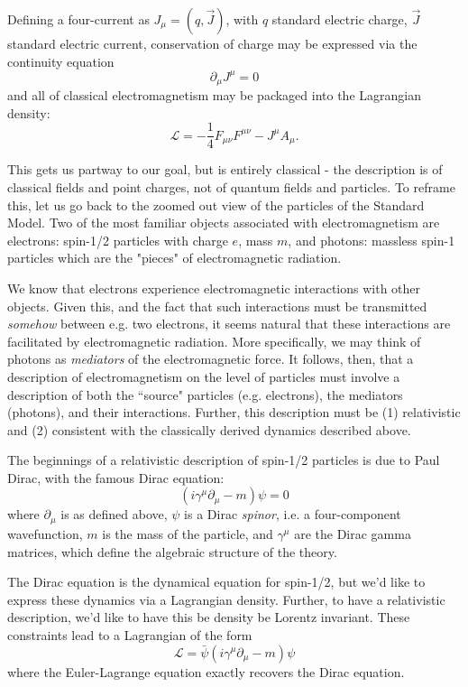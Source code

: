 Defining a four-current as $J_{\mu} = (q, \vec{J})$, with $q$ standard electric charge, $\vec{J}$ standard electric 
current, conservation of charge may be expressed via the continuity equation
\begin{equation}
\partial_{\mu}J^\mu = 0
\end{equation}
and all of classical electromagnetism may be packaged into the Lagrangian density:
\begin{equation}
\mathcal{L} = -\frac{1}{4} F_{\mu\nu}F^{\mu\nu} - J^{\mu}A_{\mu}.
\end{equation}

This gets us partway to our goal, but is entirely classical - the description is of classical fields and 
point charges, not of quantum fields and particles. To reframe this, let us go back to the zoomed out view 
of the particles of the Standard Model. Two of the most familiar objects associated with electromagnetism 
are electrons: spin-1/2 particles with charge $e$, mass $m$, and photons: massless spin-1 particles which are
the "pieces" of electromagnetic radiation.

We know that electrons experience electromagnetic interactions with other objects. Given this, and the 
fact that such interactions must be transmitted \emph{somehow} between e.g. two electrons, it seems natural 
that these interactions are facilitated by electromagnetic radiation. More specifically, we may think of 
photons as \emph{mediators} of the electromagnetic force. It follows, then, that a description of 
electromagnetism on the level of particles must involve a description of both the ``source" particles 
(e.g. electrons), the mediators (photons), and their interactions. Further, this description must be 
(1) relativistic and (2) consistent with the classically derived dynamics described above.

The beginnings of a relativistic description of spin-1/2 particles is due to Paul Dirac, with the 
famous Dirac equation:
\begin{equation}
(i\gamma^{\mu}\partial_{\mu} - m)\psi = 0
\end{equation}
where $\partial_{\mu}$ is as defined above, $\psi$ is a Dirac \emph{spinor}, i.e. a four-component 
wavefunction, $m$ is the mass of the particle, and $\gamma^{\mu}$ are the Dirac gamma matrices, 
which define the algebraic structure of the theory.


The Dirac equation is the dynamical equation for spin-1/2, but we'd like to express these dynamics 
via a Lagrangian density. Further, to have a relativistic description, we'd like to have this be 
density be Lorentz invariant. These constraints lead to a Lagrangian of the form
\begin{equation}
\mathcal{L} = \bar{\psi}(i\gamma^{\mu}\partial_{\mu} - m)\psi 
\end{equation}
where the Euler-Lagrange equation exactly recovers the Dirac equation.


